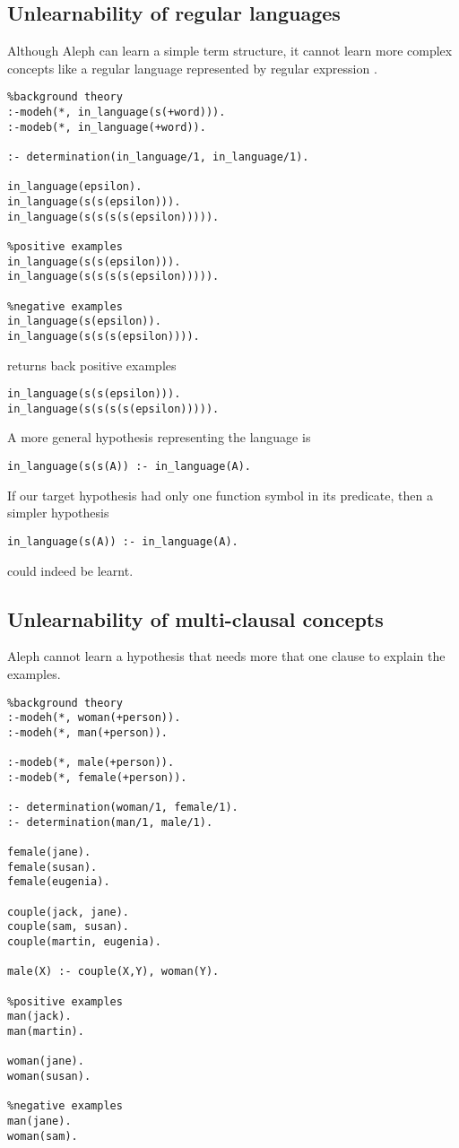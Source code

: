 \subsection{Unlearnability of regular languages}
Although Aleph can learn a simple term structure, it cannot learn more complex concepts like a regular language represented by regular expression .

\begin{lstlisting}
%background theory
:-modeh(*, in_language(s(+word))).
:-modeb(*, in_language(+word)).

:- determination(in_language/1, in_language/1).

in_language(epsilon).
in_language(s(s(epsilon))).
in_language(s(s(s(s(epsilon))))).

%positive examples
in_language(s(s(epsilon))).
in_language(s(s(s(s(epsilon))))).

%negative examples
in_language(s(epsilon)).
in_language(s(s(s(epsilon)))).
\end{lstlisting}
returns back positive examples
\begin{lstlisting}
in_language(s(s(epsilon))).
in_language(s(s(s(s(epsilon))))).
\end{lstlisting}
A more general hypothesis representing the language is
\begin{lstlisting}
in_language(s(s(A)) :- in_language(A).
\end{lstlisting}
If our target hypothesis had only one function symbol in its predicate, then a simpler hypothesis
\begin{lstlisting}
in_language(s(A)) :- in_language(A).
\end{lstlisting}
could indeed be learnt.

\subsection{Unlearnability of multi-clausal concepts}
Aleph cannot learn a hypothesis that needs more that one clause to explain the examples.

\begin{lstlisting}
%background theory
:-modeh(*, woman(+person)).
:-modeh(*, man(+person)).

:-modeb(*, male(+person)).
:-modeb(*, female(+person)).

:- determination(woman/1, female/1).
:- determination(man/1, male/1).

female(jane).
female(susan).
female(eugenia).

couple(jack, jane).
couple(sam, susan).
couple(martin, eugenia).

male(X) :- couple(X,Y), woman(Y).

%positive examples
man(jack).
man(martin).

woman(jane).
woman(susan).

%negative examples
man(jane).
woman(sam).
\end{lstlisting}


